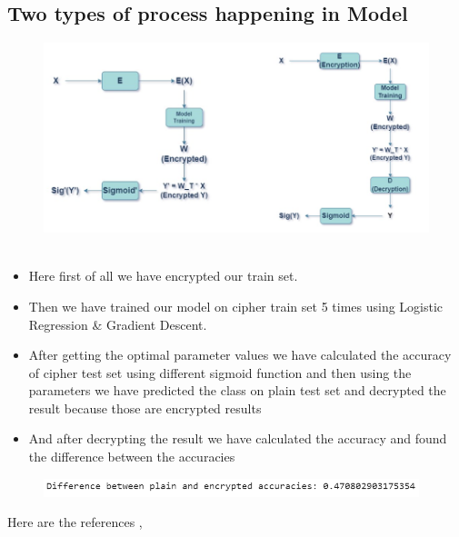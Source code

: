\documentclass{article}
\begin{document}
\subsection{Two types of process happening in Model}

\begin{figure}[!h]
\centering
\includegraphics[width = 4 in]{img18.png}~
\end{figure}

\begin{itemize}
\item Here first of all we have encrypted our train set.

\item Then we have trained our model on cipher train set 5 times using Logistic Regression \& Gradient Descent.

\item After getting the optimal parameter values we have calculated the accuracy of cipher test set using different sigmoid function and then using the parameters we have predicted the class on plain test set and decrypted the result because those are encrypted results
    
\item And after decrypting the result we have calculated the accuracy and found the difference between the accuracies

\end{itemize}

\begin{figure}[!h]
\centering
\includegraphics[width = 4.3in]{img19.png}~
\end{figure}
\newpage

Here are the references \cite{nugent2022privacy} , \cite{cheon2017homomorphic}



\end{document}
